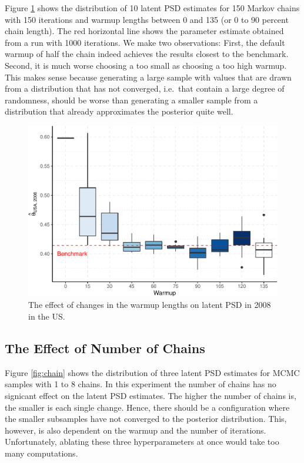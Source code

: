\documentclass[12pt,english,a4paper,oneside]{article}
\theoremstyle{definition}
\theoremstyle{definition}
\theoremstyle{definition}
\theoremstyle{definition}
\theoremstyle{remark}
\begin{document}
Figure \ref{fig:warmup} shows the distribution of 10 latent PSD estimates for 150 Markov chains with 150 iterations and warmup lengths between 0 and 135 (or 0 to 90 percent chain length). The red horizontal line shows the parameter estimate obtained from a run with 1000 iterations. We make two observations: First, the default warmup of half the chain indeed achieves the results closest to the benchmark. Second, it is much worse choosing a too small as choosing a too high warmup. This makes sense because generating a large sample with values that are drawn from a distribution that has not converged, i.e.~that contain a large degree of randomness, should be worse than generating a smaller sample from a distribution that already approximates the posterior quite well.

\begin{figure}[H]
\includegraphics[width=\textwidth]{figs/warmup-1} \caption[The effect of changes in the warmup lengths on latent PSD in 2008 in the US]{The effect of changes in the warmup lengths on latent PSD in 2008 in the US.}\label{fig:warmup}
\end{figure}

\hypertarget{the-effect-of-number-of-chains}{%
\subsection{The Effect of Number of Chains}\label{the-effect-of-number-of-chains}}

Figure \ref{fig:chain} shows the distribution of three latent PSD estimates for MCMC samples with 1 to 8 chains. In this experiment the number of chains has no signicant effect on the latent PSD estimates. The higher the number of chains is, the smaller is each single change. Hence, there should be a configuration where the smaller subsamples have not converged to the posterior distribution. This, however, is also dependent on the warmup and the number of iterations. Unfortunately, ablating these three hyperparameters at once would take too many computations.
\end{document}
